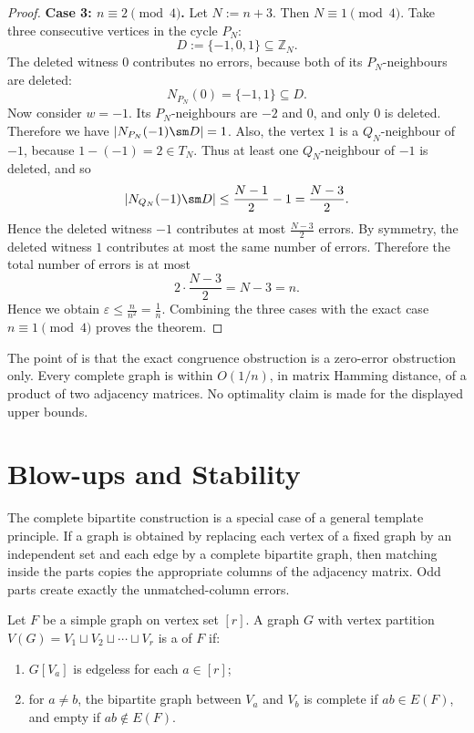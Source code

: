 \documentclass{file}
\newcommand{\eps}{\varepsilon}
\begin{document}
\begin{proof}
\medskip
\noindent
\textbf{Case 3: $n\equiv 2\pmod 4$.}
Let $N:=n+3$.
Then $N\equiv 1\pmod 4$.  
Take three consecutive vertices in the cycle $P_N$:
\[
  D:=\{-1,0,1\}\subseteq \mathbb Z_N.
\]
The deleted witness $0$ contributes no errors, because both of its
$P_N$-neighbours are deleted:
\[
  N_{P_N}(0)=\{-1,1\}\subseteq D.
\]
Now consider $w=-1$.  
Its $P_N$-neighbours are $-2$ and $0$, and only $0$ is deleted.  
Therefore we have  $|N_{P_N}(-1)\sm   D|=1$.
Also, the vertex $1$ is a $Q_N$-neighbour of $-1$, because
$1-(-1)=2\in T_N$.
Thus at least one $Q_N$-neighbour of $-1$ is deleted, and so
\[
  |N_{Q_N}(-1)\sm   D|
  \le
  \frac{N-1}{2}-1
  =
  \frac{N-3}{2}.
\]
Hence the deleted witness $-1$ contributes at most
$\frac{N-3}{2}$ errors.  
By symmetry, the deleted witness $1$ contributes at most the same number of errors.  Therefore the total number of errors is at most
\[
  2\cdot \frac{N-3}{2}
  =
  N-3
  =
  n.
\]
Hence we obtain $\eps\le \frac{n}{n^2}=\frac1n$.
Combining the three cases with the exact case $n\equiv 1\pmod 4$ proves the
theorem.
\end{proof}

The point of  is that the exact congruence
obstruction is a zero-error obstruction only.  Every complete graph is within
$O(1/n)$, in matrix Hamming distance, of a product of two adjacency matrices.
No optimality claim is made for the displayed upper bounds.


\section{Blow-ups and Stability }
\label{sec:blowups}

The complete bipartite construction is a special case of a general template
principle.  If a graph is obtained by replacing each vertex of a fixed graph by
an independent set and each edge by a complete bipartite graph, then matching
inside the parts copies the appropriate columns of the adjacency matrix.  Odd
parts create exactly the unmatched-column errors.

\begin{defn}
Let $F$ be a simple graph on vertex set $[r]$.  A graph $G$ with vertex partition  $V(G)=V_1\sqcup V_2\sqcup\cdots\sqcup V_r$
is a  of $F$ if:
\begin{enumerate}
  \item $G[V_a]$ is edgeless for each $a\in[r]$;
  \item for $a\neq b$, the bipartite graph between $V_a$ and $V_b$ is complete
  if $ab\in E(F)$, and empty if $ab\notin E(F)$.
\end{enumerate}
\end{defn}
\end{document}

